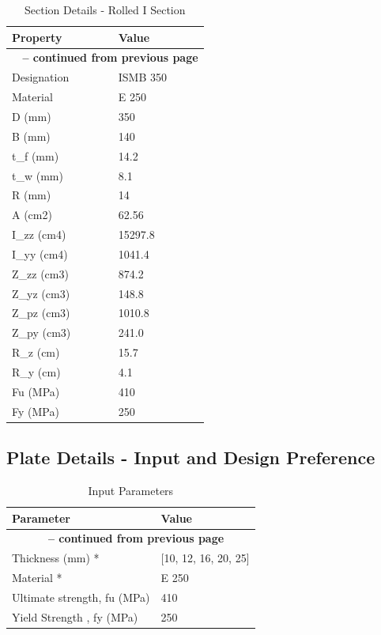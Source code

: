 \documentclass[12pt]{article}
\begin{document}
\begin{longtable}{ll}
\caption{Section Details - Rolled I Section}
\label{tab:section-details}
\cellcolor{OsdagGreen} Property & \cellcolor{OsdagGreen} Value \\ \hline
\endfirsthead
\multicolumn{2}{c}{{\bfseries \tablename\ \thetable{} -- continued from previous page}} \\
\endhead
\endfoot
\endlastfoot
Designation & ISMB 350 \\
\hline
Material & E 250 \\
\hline
D (mm) & 350 \\
\hline
B (mm) & 140 \\
\hline
t\_f (mm) & 14.2 \\
\hline
t\_w (mm) & 8.1 \\
\hline
R (mm) & 14 \\
\hline
A (cm2) & 62.56 \\
\hline
I\_zz (cm4) & 15297.8 \\
\hline
I\_yy (cm4) & 1041.4 \\
\hline
Z\_zz (cm3) & 874.2 \\
\hline
Z\_yz (cm3) & 148.8 \\
\hline
Z\_pz (cm3) & 1010.8 \\
\hline
Z\_py (cm3) & 241.0 \\
\hline
R\_z (cm) & 15.7 \\
\hline
R\_y (cm) & 4.1 \\
\hline
Fu (MPa) & 410 \\
\hline
Fy (MPa) & 250 \\
\hline
\end{longtable}

\subsection{Plate Details - Input and Design Preference}

\begin{longtable}{ll}
\caption{Input Parameters}
\label{tab:input}
Parameter & Value \\ \hline
\endfirsthead
\multicolumn{2}{c}{{\bfseries \tablename\ \thetable{} -- continued from previous page}} \\
\endhead
\endfoot
\endlastfoot
Thickness (mm) * & [10, 12, 16, 20, 25] \\
\hline
Material * & E 250 \\
\hline
Ultimate strength, fu (MPa) & 410 \\
\hline
Yield Strength , fy (MPa) & 250 \\
\hline
\end{longtable}
\end{document}
